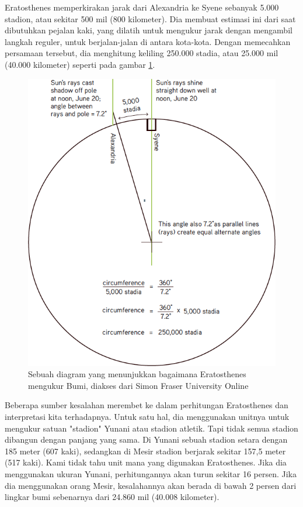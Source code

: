 Eratosthenes memperkirakan jarak dari Alexandria ke Syene sebanyak 5.000 stadion, atau sekitar 500 mil (800 kilometer). Dia membuat estimasi ini dari saat dibutuhkan pejalan kaki, yang dilatih untuk mengukur jarak dengan mengambil langkah reguler, untuk berjalan-jalan di antara kota-kota. Dengan memecahkan persamaan tersebut, dia menghitung keliling 250.000 stadia, atau 25.000 mil (40.000 kilometer) seperti pada gambar \ref{diagrampengukuranbumi}.
\begin{figure}[ht]
	\centerline{\includegraphics[width=1\textwidth]{figures/diagrampengukuranbumi.png}}
	\caption{Sebuah diagram yang menunjukkan bagaimana Eratosthenes mengukur Bumi, diakses dari Simon Fraser University Online}
	\label{diagrampengukuranbumi}
	\end{figure}
Beberapa sumber kesalahan merembet ke dalam perhitungan Eratosthenes dan interpretasi kita terhadapnya. Untuk satu hal, dia menggunakan unitnya untuk mengukur satuan "stadion" Yunani atau stadion atletik. Tapi tidak semua stadion dibangun dengan panjang yang sama. Di Yunani sebuah stadion setara dengan 185 meter (607 kaki), sedangkan di Mesir stadion berjarak sekitar 157,5 meter (517 kaki). Kami tidak tahu unit mana yang digunakan Eratosthenes. Jika dia menggunakan ukuran Yunani, perhitungannya akan turun sekitar 16 persen. Jika dia menggunakan orang Mesir, kesalahannya akan berada di bawah 2 persen dari lingkar bumi sebenarnya dari 24.860 mil (40.008 kilometer).
